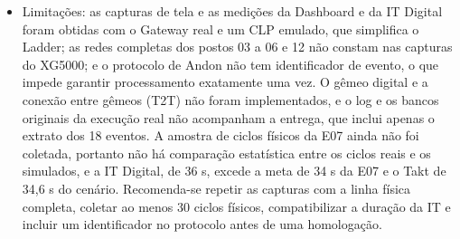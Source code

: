 \begin{itemize}
    \item Limitações: as capturas de tela e as medições da Dashboard e da IT Digital foram obtidas com o Gateway real e um CLP emulado, que simplifica o Ladder; as redes completas dos postos 03 a 06 e 12 não constam nas capturas do XG5000; e o protocolo de Andon não tem identificador de evento, o que impede garantir processamento exatamente uma vez. O gêmeo digital e a conexão entre gêmeos (T2T) não foram implementados, e o log e os bancos originais da execução real não acompanham a entrega, que inclui apenas o extrato dos 18 eventos. A amostra de ciclos físicos da E07 ainda não foi coletada, portanto não há comparação estatística entre os ciclos reais e os simulados, e a IT Digital, de 36 s, excede a meta de 34 s da E07 e o Takt de 34,6 s do cenário. Recomenda-se repetir as capturas com a linha física completa, coletar ao menos 30 ciclos físicos, compatibilizar a duração da IT e incluir um identificador no protocolo antes de uma homologação.
\end{itemize}
